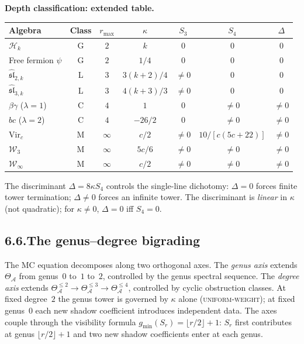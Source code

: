 \documentclass[11pt,reqno]{amsart}
\theoremstyle{definition}
\theoremstyle{remark}
\providecommand{\cA}{\mathcal{A}}
\providecommand{\cH}{\mathcal{H}}
\providecommand{\cW}{\mathcal{W}}
\providecommand{\Vir}{\mathrm{Vir}}
\providecommand{\fsl}{\mathfrak{sl}}
\numberwithin{equation}{section}
\begin{document}
\medskip
\noindent\textbf{Depth classification: extended table.}\enspace
\begin{center}
\small
\renewcommand{\arraystretch}{1.2}
\begin{tabular}{lcccccc}
\textbf{Algebra} & \textbf{Class} & $r_{\max}$ & $\kappa$ & $S_3$ & $S_4$ & $\Delta$\\
\hline
$\cH_k$ & G & $2$ & $k$ & $0$ & $0$ & $0$\\
Free fermion $\psi$ & G & $2$ & $1/4$ & $0$ & $0$ & $0$\\
$\widehat{\fsl}_{2,k}$ & L & $3$ & $3(k{+}2)/4$ & $\neq 0$ & $0$ & $0$\\
$\widehat{\fsl}_{3,k}$ & L & $3$ & $4(k{+}3)/3$ & $\neq 0$ & $0$ & $0$\\
$\beta\gamma$ ($\lambda{=}1$) & C & $4$ & $1$ & $0$ & $\neq 0$ & $\neq 0$\\
$bc$ ($\lambda{=}2$) & C & $4$ & $-26/2$ & $0$ & $\neq 0$ & $\neq 0$\\
$\Vir_c$ & M & $\infty$ & $c/2$ & $\neq 0$ & $10/[c(5c{+}22)]$ & $\neq 0$\\
$\cW_3$ & M & $\infty$ & $5c/6$ & $\neq 0$ & $\neq 0$ & $\neq 0$\\
$\cW_\infty$ & M & $\infty$ & $c/2$ & $\neq 0$ & $\neq 0$ & $\neq 0$
\end{tabular}
\end{center}
The discriminant $\Delta=8\kappa S_4$ controls the single-line
dichotomy: $\Delta=0$ forces finite tower termination;
$\Delta\neq 0$ forces an infinite tower. The discriminant is
\emph{linear} in $\kappa$ (not quadratic); for $\kappa\neq 0$,
$\Delta=0$ iff $S_4=0$.

\subsection*{6.6.\enspace The genus--degree bigrading}

The MC equation decomposes along two orthogonal axes. The \emph{genus
axis} extends $\Theta_\cA$ from genus~$0$ to~$1$ to~$2$, controlled by
the genus spectral sequence. The \emph{degree axis} extends
$\Theta_\cA^{\le 2}\to\Theta_\cA^{\le 3}\to\Theta_\cA^{\le 4}$,
controlled by cyclic obstruction classes. At fixed degree~$2$ the
genus tower is governed by $\kappa$ alone \textsc{(uniform-weight)};
at fixed genus~$0$ each new shadow coefficient introduces independent
data. The axes couple through the visibility formula
$g_{\min}(S_r)=\lfloor r/2\rfloor+1$: $S_r$ first contributes at
genus $\lfloor r/2\rfloor+1$ and two new shadow coefficients enter at
each genus.
\end{document}
